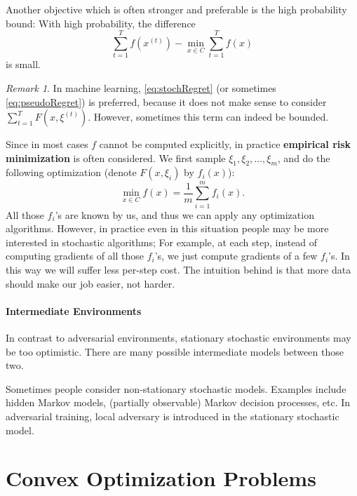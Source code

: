 \documentclass[openany]{book}
\theoremstyle{definition}
\theoremstyle{remark}
\newtheorem*{remark}{Remark}
\begin{document}
Another objective which is often stronger and preferable is the high probability bound: With high probability, the difference
\begin{equation}\label{eq:stochRegret}
    \sum_{t=1}^{T}f(x^{(t)})-\min_{x\in C}\sum_{t=1}^{T}f(x)
\end{equation}
is small.
\begin{remark}
    In machine learning, \eqref{eq:stochRegret} (or sometimes \eqref{eq:pseudoRegret}) is preferred, because it does not make sense to consider $\sum_{t=1}^{T}F(x,\xi^{(t)})$. However, sometimes this term can indeed be bounded.
\end{remark}

Since in most cases $f$ cannot be computed explicitly, in practice \textbf{empirical risk minimization} is often considered. We first sample $\xi_1,\xi_2,\ldots,\xi_m$, and do the following optimization (denote $F(x,\xi_i)$ by $f_i(x)$):
\begin{equation}\label{finiteSum}
    \min_{x\in C}f(x)=\frac{1}{m}\sum_{i=1}^{m}f_i(x).
\end{equation}
All those $f_i$'s are known by us, and thus we can apply any optimization algorithms. However, in practice even in this situation people may be more interested in stochastic algorithms; For example, at each step, instead of computing gradients of all those $f_i$'s, we just compute gradients of a few $f_i$'s. In this way we will suffer less per-step cost. The intuition behind is that more data should make our job easier, not harder.

\paragraph{Intermediate Environments}
In contrast to adversarial environments, stationary stochastic environments may be too optimistic. There are many possible intermediate models between those two.

Sometimes people consider non-stationary stochastic models. Examples include hidden Markov models, (partially observable) Markov decision processes, etc. In adversarial training, local adversary is introduced in the stationary stochastic model.

\section{Convex Optimization Problems}
\end{document}
